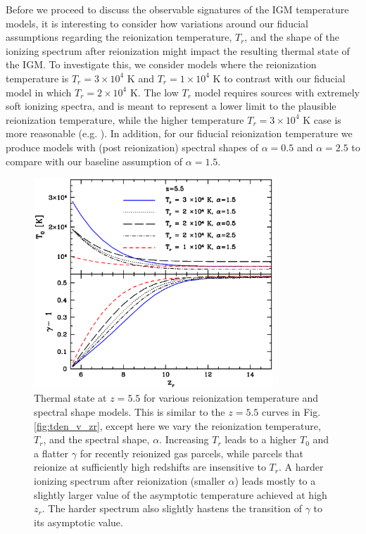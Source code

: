 Before we proceed to discuss the observable signatures of the IGM temperature models, it is interesting to consider
how variations around our fiducial assumptions regarding the reionization temperature, $T_r$, and the shape
of the ionizing spectrum after reionization might impact the resulting thermal state of the IGM. To investigate this,
we consider models where the reionization temperature is $T_r = 3 \times 10^4$ K and $T_r=1 \times 10^4$ K to
contrast with our fiducial model in which $T_r = 2 \times 10^4$ K. The low $T_r$ model requires sources with
extremely soft ionizing spectra, and is meant to represent a lower limit to the plausible reionization temperature,
while the higher temperature $T_r = 3 \times 10^4$ K case is more reasonable (e.g. \citealt{McQuinn:2012bq}).  
In addition, for our fiducial reionization temperature
we produce models with (post reionization) spectral shapes of $\alpha=0.5$ and $\alpha=2.5$ to compare with our baseline assumption of
$\alpha=1.5$.

\begin{figure}[t]
\includegraphics[width=9cm]{f8.eps}
\caption{Thermal state at $z=5.5$ for various reionization temperature and spectral shape models. This is similar to the
$z=5.5$ curves in Fig. \ref{fig:tden_v_zr}, except here we vary the reionization temperature, $T_r$, and the spectral shape,
$\alpha$. Increasing $T_r$ leads to a higher $T_0$ and a flatter $\gamma$ for recently reionized gas parcels, while parcels
that reionize at sufficiently high redshifts are insensitive to $T_r$. A harder ionizing spectrum after reionization 
(smaller $\alpha$) leads mostly to a slightly larger value of the asymptotic temperature achieved at high $z_r$.
The harder spectrum also slightly hastens the transition of $\gamma$ to its asymptotic value.}
\label{fig:temp_v_treion}
\end{figure}

